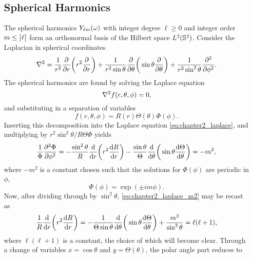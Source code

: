\subsection{Spherical Harmonics}

The spherical harmonics \({Y}_{\ell m}(\omega)\) with integer degree \(\ell \geq 0\) and integer order \(m \leq \big\lvert\ell\big\rvert\) form an orthonormal basis of the Hilbert space \(L^{2}(\mathbb{S}^{2})\).
Consider the Laplacian in spherical coordinates
%
\begin{equation}
	\laplacian
	= \frac{1}{r^{2}} \pdv{r} \bigg(r^{2} \pdv{r}\bigg)
	+ \frac{1}{r^{2}\sin{\theta}} \pdv{\theta} \bigg(\sin{\theta} \pdv{\theta}\bigg)
	+ \frac{1}{r^{2}\sin^{2}{\theta}} \pdv[2]{\phi}.
\end{equation}
%
The spherical harmonics are found by solving the Laplace equation
%
\begin{equation}\label{eq:chapter2_laplace}
	\laplacian{f(r,\theta,\phi)}
	= 0,
\end{equation}
%
and substituting in a separation of variables
%
\begin{equation}
	f(r,\theta,\phi)
	= R(r)\Theta(\theta)\Phi(\phi).
\end{equation}
%
Inserting this decomposition into the Laplace equation \cref{eq:chapter2_laplace}, and multiplying by \(r^{2}\sin^{2}{\theta}/R\Theta\Phi{}\) yields
%
\begin{equation}\label{eq:chapter2_laplace_m2}
	\frac{1}{\Phi} \pdv[2]{\Phi}{\phi}
	= -\frac{\sin^{2}{\theta}}{R} \dv{r} \bigg(r^{2} \dv{R}{r}\bigg)
	- \frac{\sin{\theta}}{\Theta} \dv{\theta} \bigg(\sin{\theta} \dv{\Theta}{\theta}\bigg)
	= -m^{2},
\end{equation}
%
where \(-m^{2}\) is a constant chosen such that the solutions for \(\Phi(\phi)\) are periodic in \(\phi{}\), \ie{}
%
\begin{equation}
	\Phi(\phi)
	= \exp(\pm i m\phi).
\end{equation}
%
Now, after dividing through by \(\sin^{2}{\theta}\), \cref{eq:chapter2_laplace_m2} may be recast as
%
\begin{equation}
	\frac{1}{R} \dv{r} \bigg(r^{2} \dv{R}{r}\bigg)
	= -\frac{1}{\Theta\sin{\theta}} \dv{\theta} \bigg(\sin{\theta} \dv{\Theta}{\theta}\bigg)
	+ \frac{m^{2}}{\sin^{2}{\theta}}
	= \ell(\ell+1),
\end{equation}
%
where \(\ell(\ell+1)\) is a constant, the choice of which will become clear.
Through a change of variables \(x=\cos{\theta}\) and \(y=\Theta(\theta)\), the polar angle part reduces to
